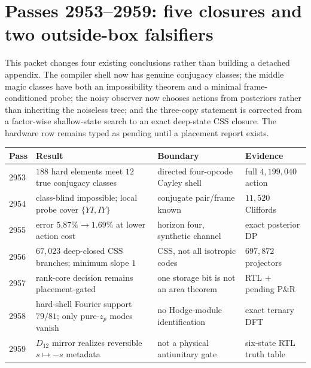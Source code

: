 \section{Passes 2953--2959: five closures and two outside-box falsifiers}
\label{sec:bt2953-bt2959}

\begin{plain}
This packet changes four existing conclusions rather than building a detached appendix.
The compiler shell now has genuine conjugacy classes; the middle magic classes have both
an impossibility theorem and a minimal frame-conditioned probe; the noisy observer now
chooses actions from posteriors rather than inheriting the noiseless tree; and the
three-copy statement is corrected from a factor-wise shallow-state search to an exact
deep-state CSS closure.  The hardware row remains typed as pending until a placement
report exists.
\end{plain}

{\small
\begin{center}
\begin{tabular}{@{}p{1.0cm}p{5.2cm}p{5.0cm}p{2.5cm}@{}}
\toprule
\textbf{Pass} & \textbf{Result} & \textbf{Boundary} & \textbf{Evidence}\\
\midrule
2953 & $188$ hard elements meet $12$ true conjugacy classes & directed four-opcode Cayley shell & full $4{,}199{,}040$ action\\
2954 & class-blind impossible; local probe cover $\{YI,IY\}$ & conjugate pair/frame known & $11{,}520$ Cliffords\\
2955 & error $5.87\%\to1.69\%$ at lower action cost & horizon four, synthetic channel & exact posterior DP\\
2956 & $67{,}023$ deep-closed CSS branches; minimum slope $1$ & CSS, not all isotropic codes & $697{,}872$ projectors\\
2957 & rank-core decision remains placement-gated & one storage bit is not an area theorem & RTL $+$ pending P\&R\\
2958 & hard-shell Fourier support $79/81$; only pure-$z_p$ modes vanish & no Hodge-module identification & exact ternary DFT\\
2959 & $D_{12}$ mirror realizes reversible $s\mapsto-s$ metadata & not a physical antiunitary gate & six-state RTL truth table\\
\bottomrule
\end{tabular}
\end{center}}

